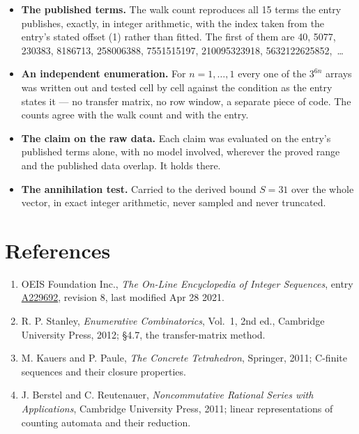\documentclass[11pt]{article}
\theoremstyle{definition}
\begin{document}
\begin{itemize}

\item {\bfseries The published terms.} The walk count reproduces all 15 terms the entry publishes, exactly, in integer arithmetic, with the index taken from the entry's stated offset (1) rather than fitted. The first of them are 40, 5077, 230383, 8186713, 258006388, 7551515197, 210095323918, 5632122625852,~\dots

\item {\bfseries An independent enumeration.} For $n = 1,\dots,1$ every one of the $3^{6n}$ arrays was written out and tested cell by cell against the condition as the entry states it --- no transfer matrix, no row window, a separate piece of code. The counts agree with the walk count and with the entry.

\item {\bfseries The claim on the raw data.} Each claim was evaluated on the entry's published terms alone, with no model involved, wherever the proved range and the published data overlap. It holds there.

\item {\bfseries The annihilation test.} Carried to the derived bound $S = 31$ over the whole vector, in exact integer arithmetic, never sampled and never truncated.

\end{itemize}

\section{References}

\begin{enumerate}

\item OEIS Foundation Inc., \emph{The On-Line Encyclopedia of Integer Sequences}, entry \href{https://oeis.org/A229692}{A229692}, revision 8, last modified Apr 28 2021.

\item R. P. Stanley, \emph{Enumerative Combinatorics}, Vol.~1, 2nd ed., Cambridge University Press, 2012; \S4.7, the transfer-matrix method.

\item M. Kauers and P. Paule, \emph{The Concrete Tetrahedron}, Springer, 2011; C-finite sequences and their closure properties.

\item J. Berstel and C. Reutenauer, \emph{Noncommutative Rational Series with Applications}, Cambridge University Press, 2011; linear representations of counting automata and their reduction.

\end{enumerate}
\end{document}
